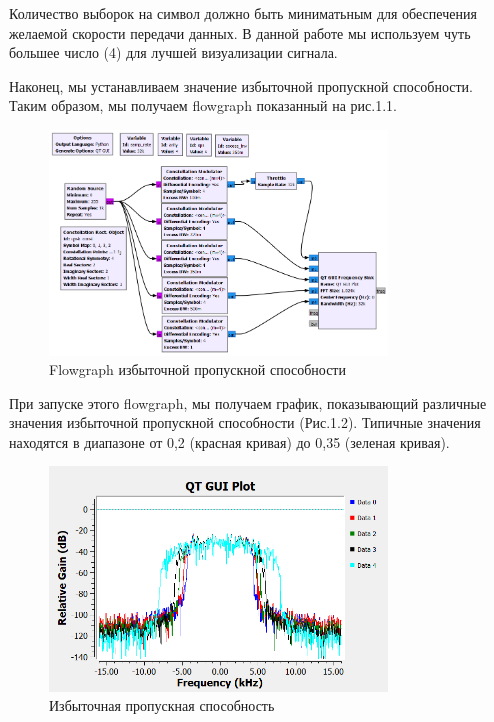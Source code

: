 \documentclass[a4paper,12pt]{report}
\begin{document}
    Количество выборок на символ должно быть миниматьным для обеспечения желаемой скорости передачи данных. В данной работе мы используем чуть большее число (4) для лучшей визуализации сигнала.
    
    Наконец, мы устанавливаем значение избыточной пропускной способности. Таким образом, мы получаем flowgraph показанный на рис.1.1.
\begin{figure}[H]
        \centering
        \includegraphics[width=0.8\textwidth]{fig1-1.PNG}
        \caption{Flowgraph избыточной пропускной способности}
        \label{fig:fig1-1}
\end{figure} 

    При запуске этого flowgraph, мы получаем график, показывающий различные значения избыточной пропускной способности (Рис.1.2). Типичные значения находятся в диапазоне от 0,2 (красная кривая) до 0,35 (зеленая кривая).
\begin{figure}[H]
        \centering
        \includegraphics[width=0.8\textwidth]{fig1-2.PNG}
        \caption{Избыточная пропускная способность}
        \label{fig:fig1-2}
\end{figure}    
    
\end{document}
